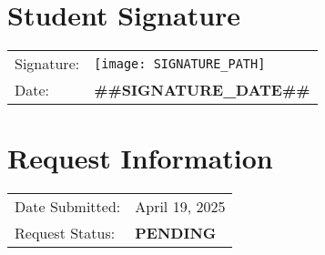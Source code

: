 \documentclass[12pt]{article}
\begin{document}
\section*{Student Signature}
\begin{tabular}{ll}
Signature: & \texttt{[image: SIGNATURE\_PATH]} \\
Date: & \textbf{##SIGNATURE_DATE##} \\
\end{tabular}

\vspace{0.5cm}

\section*{Request Information}
\begin{tabular}{ll}
Date Submitted: & April 19, 2025 \\
Request Status: & \textbf{PENDING} \\
\end{tabular}



\label{LastPage}
\end{document}
